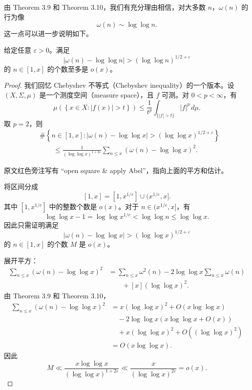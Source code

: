 由 Theorem 3.9 和 Theorem 3.10，我们有充分理由相信，对大多数 $n$，$\omega(n)$ 的行为像
\[
	\omega(n)\sim \log\log n.
\]
这一点可以进一步说明如下。


\begin{theorem}[原文 Theorem 3.11]
	给定任意 $\varepsilon>0$。满足
	\[
		\left|\omega(n)-\log\log n\right|
		>
		(\log\log n)^{1/2+\varepsilon}
	\]
	的 $n\in[1,x]$ 的个数至多是 $o(x)$。
\end{theorem}

\begin{proof}
	我们回忆 Chebyshev 不等式（Chebyshev inequality）的一个版本。设 $(X,\Sigma,\mu)$ 是一个测度空间（measure space），且 $f$ 可测。对 $0<p<\infty$，有
	\[
		\mu\left(\left\{x\in X:|f(x)|>t\right\}\right)
		\leq
		\frac1{t^p}\int_{\{|f|>t\}}|f|^p\,d\mu.
	\]
	取 $p=2$，则
	\[
	\begin{aligned}
		&\#\left\{n\in[1,x]:
		\left|\omega(n)-\log\log x\right|
		>
		(\log\log x)^{1/2+\varepsilon}
		\right\} \\
		&\qquad\leq
		\frac1{(\log\log x)^{1+2\varepsilon}}
		\sum_{n\leq x}\left(\omega(n)-\log\log x\right)^2.
	\end{aligned}
	\]
	\begin{remark}
		原文红色旁注写有 “open square \& apply Abel”，指向上面的平方和估计。
	\end{remark}

	将区间分成
	\[
		[1,x]=[1,x^{1/e}]\cup (x^{1/e},x].
	\]
	其中 $[1,x^{1/e}]$ 中的整数个数是 $o(x)$。对于 $n\in(x^{1/e},x]$，有
	\[
		\log\log x-1=\log\log x^{1/e}<\log\log n\leq \log\log x.
	\]
	因此只需证明满足
	\[
		\left|\omega(n)-\log\log x\right|
		>
		(\log\log x)^{1/2+\varepsilon}
	\]
	的 $n\in[1,x]$ 的个数 $M$ 是 $o(x)$。

	展开平方：
	\[
	\begin{aligned}
		\sum_{n\leq x}\left(\omega(n)-\log\log x\right)^2
		&=
		\sum_{n\leq x}\omega^2(n)
		-
		2\log\log x\sum_{n\leq x}\omega(n)\\
		&\qquad+
		[x](\log\log x)^2.
	\end{aligned}
	\]
	由 Theorem 3.9 和 Theorem 3.10，
	\[
	\begin{aligned}
		\sum_{n\leq x}\left(\omega(n)-\log\log x\right)^2
		&=
		x(\log\log x)^2+O(x\log\log x)\\
		&\quad
		-2\log\log x\left(x\log\log x+O(x)\right)\\
		&\quad
		+x(\log\log x)^2+O\left((\log\log x)^2\right)\\
		&=
		O(x\log\log x).
	\end{aligned}
	\]
	因此
	\[
		M
		\ll
		\frac{x\log\log x}{(\log\log x)^{1+2\varepsilon}}
		\ll
		\frac{x}{(\log\log x)^{2\varepsilon}}
		=
		o(x).
	\]
\end{proof}

